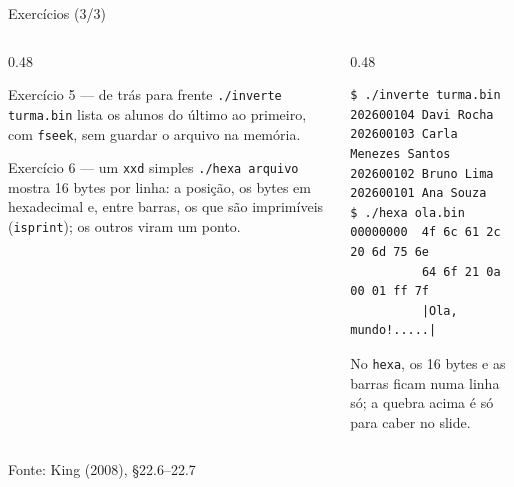 \documentclass[aspectratio=169]{beamer}
\newcommand{\fonte}[1]{\vfill\hfill{\scriptsize\textcolor{UFSGray}{Fonte: #1}}}
\begin{document}
\begin{frame}[fragile]{Exercícios (3/3)}
  \footnotesize
  \begin{columns}[T]
    \begin{column}{0.48\textwidth}
      \begin{block}{Exercício 5 --- de trás para frente}
        \texttt{./inverte turma.bin} lista os alunos do último ao primeiro,
        com \texttt{fseek}, sem guardar o arquivo na memória.
      \end{block}
      \begin{block}{Exercício 6 --- um \texttt{xxd} simples}
        \texttt{./hexa arquivo} mostra 16 bytes por linha: a posição, os
        bytes em hexadecimal e, entre barras, os que são imprimíveis
        (\texttt{isprint}); os outros viram um ponto.
      \end{block}
    \end{column}
    \begin{column}{0.48\textwidth}
\begin{lstlisting}[style=shellS, language={}]
$ ./inverte turma.bin
202600104 Davi Rocha
202600103 Carla Menezes Santos
202600102 Bruno Lima
202600101 Ana Souza
$ ./hexa ola.bin
00000000  4f 6c 61 2c 20 6d 75 6e
          64 6f 21 0a 00 01 ff 7f
          |Ola, mundo!.....|
\end{lstlisting}
      \scriptsize\raggedright No \texttt{hexa}, os 16 bytes e as barras
      ficam numa linha só; a quebra acima é só para caber no slide.
    \end{column}
  \end{columns}
  \fonte{King (2008), §22.6--22.7~\cite{king2008c}}
\end{frame}
\end{document}
